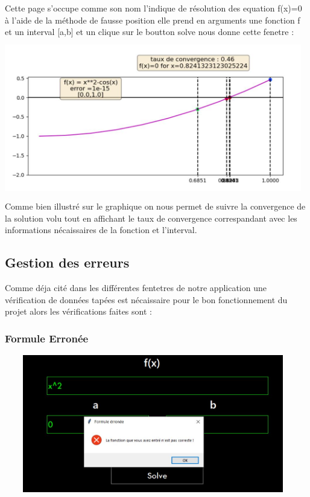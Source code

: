 \documentclass{article}
\begin{document}
Cette page s'occupe comme son nom l'indique de résolution des equation f(x)=0 à l'aide de la méthode de fausse position elle prend en arguments une fonction f et un interval [a,b] et un clique sur le boutton solve nous donne cette fenetre : \\
\includegraphics[width=13cm,height=7cm]{img/cordes_graph.JPG}\\

Comme bien illustré sur le graphique on nous permet de suivre la convergence de la solution volu tout en affichant le taux de convergence correspandant avec les informations nécaissaires de la fonction et l'interval.\\
\newpage
\subsection{Gestion des erreurs}
Comme déja cité dans les différentes fentetres de notre application une vérification de données tapées est nécaissaire pour le bon fonctionnement du projet alors les vérifications faites sont :

\subsubsection{Formule Erronée}
\includegraphics[width=13cm,height=6cm]{img/validation/err_fct.JPG}\\
\end{document}
